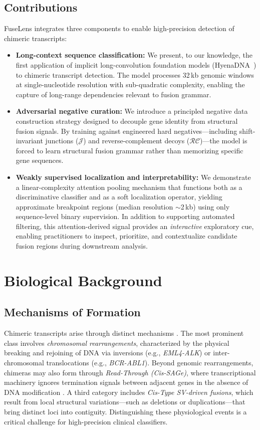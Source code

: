 \documentclass{bioinfo}
\begin{document}
\subsection{Contributions}
FuseLens integrates three components to enable high-precision detection of chimeric transcripts:
\begin{itemize}
   \item \textbf{Long-context sequence classification:} We present, to our knowledge, the first application of implicit long-convolution foundation models (HyenaDNA~\cite{hyenadna}) to chimeric transcript detection. The model processes 32\,kb genomic windows at single-nucleotide resolution with sub-quadratic complexity, enabling the capture of long-range dependencies relevant to fusion grammar.

   \item \textbf{Adversarial negative curation:} We introduce a principled negative data construction strategy designed to decouple gene identity from structural fusion signals. By training against engineered hard negatives---including shift-invariant junctions ($\mathcal{J}$) and reverse-complement decoys ($\mathcal{RC}$)---the model is forced to learn structural fusion grammar rather than memorizing specific gene sequences.

   \item \textbf{Weakly supervised localization and interpretability:} We demonstrate a linear-complexity attention pooling mechanism that functions both as a discriminative classifier and as a soft localization operator, yielding approximate breakpoint regions (median resolution $\sim$2\,kb) using only sequence-level binary supervision. In addition to supporting automated filtering, this attention-derived signal provides an \emph{interactive} exploratory cue, enabling practitioners to inspect, prioritize, and contextualize candidate fusion regions during downstream analysis.

\end{itemize}
\section{Biological Background}
\subsection{Mechanisms of Formation}
Chimeric transcripts arise through distinct mechanisms \cite{chimeras_shape}. The most prominent class involves \textit{chromosomal rearrangements}, characterized by the physical breaking and rejoining of DNA via inversions (e.g., \textit{EML4-ALK}) or inter-chromosomal translocations (e.g., \textit{BCR-ABL1}). Beyond genomic rearrangements, chimeras may also form through \textit{Read-Through (Cis-SAGe)}, where transcriptional machinery ignores termination signals between adjacent genes in the absence of DNA modification \cite{slc45a3_elk4}. A third category includes \textit{Cis-Type SV-driven fusions}, which result from local structural variations—such as deletions or duplications—that bring distinct loci into contiguity. Distinguishing these physiological events is a critical challenge for high-precision clinical classifiers.
\end{document}

